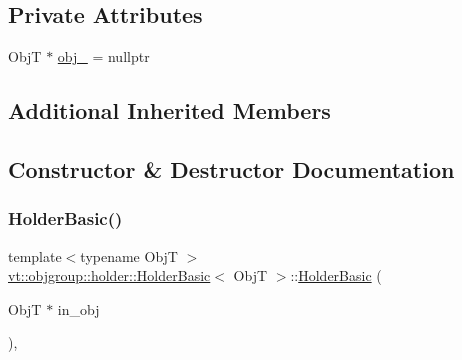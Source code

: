 \subsection*{Private Attributes}
\begin{DoxyCompactItemize}
\item 
ObjT $\ast$ \hyperlink{structvt_1_1objgroup_1_1holder_1_1_holder_basic_a2313dfbdc994c52b649ee2fc666f1219}{obj\+\_\+} = nullptr
\end{DoxyCompactItemize}
\subsection*{Additional Inherited Members}


\subsection{Constructor \& Destructor Documentation}
\mbox{\label{structvt_1_1objgroup_1_1holder_1_1_holder_basic_a0e74a9b5eb928c8d9cdaf81dd0994d7b}} 
\subsubsection{\texorpdfstring{Holder\+Basic()}{HolderBasic()}}
{\footnotesize\ttfamily template$<$typename ObjT $>$ \\
\hyperlink{structvt_1_1objgroup_1_1holder_1_1_holder_basic}{vt\+::objgroup\+::holder\+::\+Holder\+Basic}$<$ ObjT $>$\+::\hyperlink{structvt_1_1objgroup_1_1holder_1_1_holder_basic}{Holder\+Basic} (\begin{DoxyParamCaption}\item[{ObjT $\ast$}]{in\+\_\+obj }\end{DoxyParamCaption})\hspace{0.3cm}{\ttfamily [inline]}, {\ttfamily [explicit]}}

\mbox{\label{structvt_1_1objgroup_1_1holder_1_1_holder_basic_a7446aae8de5ccb8e9cceee2143ca29ea}} 
